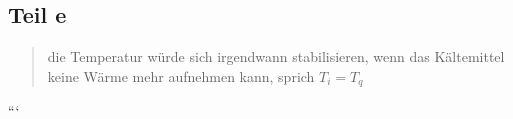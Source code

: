 \subsection*{Teil e}
\begin{quote}
die Temperatur würde sich irgendwann stabilisieren, wenn das Kältemittel keine Wärme mehr aufnehmen kann, sprich $T_i = T_q$
\end{quote}

```